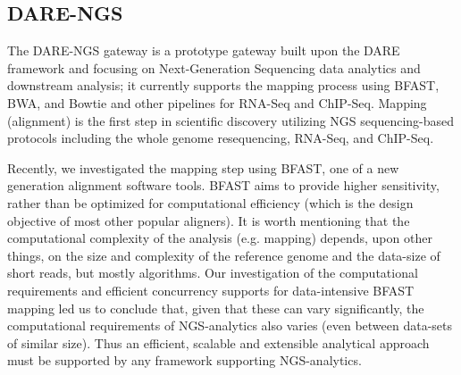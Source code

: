 \documentclass[]{svjour3}
\begin{document}

\subsection{DARE-NGS}

The DARE-NGS gateway %
is a prototype gateway built upon the DARE framework and focusing on
Next-Generation Sequencing data analytics and downstream analysis; it
currently supports the mapping process using BFAST, BWA, and Bowtie
and other pipelines for RNA-Seq and
ChIP-Seq\cite{mardis2008-arghg,ecmls_ccpe10}. Mapping (alignment) is
the first step in scientific discovery utilizing NGS sequencing-based
protocols including the whole genome resequencing, RNA-Seq, and
ChIP-Seq.

Recently, we investigated the mapping step using BFAST, one of a new
generation alignment software tools. BFAST aims to provide higher
sensitivity, rather than be optimized for computational efficiency
(which is the design objective of most other popular aligners).
It is worth mentioning that the computational complexity of the
analysis (e.g. mapping) depends, upon other things, on the size and
complexity of the reference genome and the data-size of short reads,
but mostly algorithms\cite{dare-ecmls11}.  Our investigation of the
computational requirements and efficient concurrency supports for
data-intensive BFAST mapping led us to conclude that, given that these
can vary significantly, the computational requirements of
NGS-analytics also varies (even between data-sets of similar
size). Thus an efficient, scalable and extensible analytical approach
must be supported by any framework supporting NGS-analytics.

\end{document}
